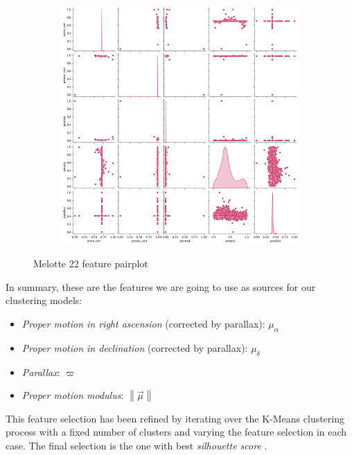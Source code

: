\documentclass[11pt, a4paper, english]{book}
\begin{document}
\begin{figure}[htbp]
  \centering
  \begin{subfigure}{\textwidth}
    \centering
    \includegraphics[width=\textwidth]{../figures/melotte_22/features_melotte_22.png}
  \end{subfigure}
  \caption{Melotte 22 feature pairplot}
  \label{fig:features_melotte_22}
\end{figure}

\pagebreak

In summary, these are the features we are going to use as sources for our clustering models:

\begin{itemize}
  \item \emph{Proper motion in right ascension} (corrected by parallax): $\mu_{\alpha}$
  \item \emph{Proper motion in declination} (corrected by parallax): $\mu_{\delta}$
  \item \emph{Parallax}: $\varpi$
  \item \emph{Proper motion modulus}: $\left\| \vec{\mu} \right\|$
\end{itemize}

This feature selection has been refined by iterating over the K-Means clustering process with a fixed number of clusters and varying the feature selection in each case.
The final selection is the one with best \emph{silhouette score} \cite{rousseeuw1987silhouettes}.
\end{document}
